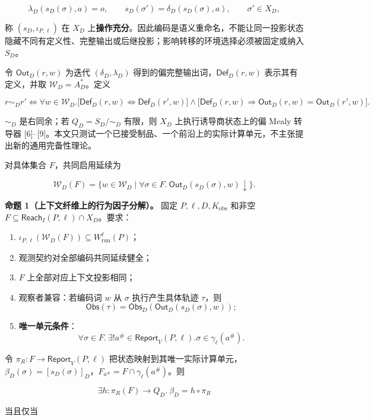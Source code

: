 \documentclass[
  11pt,
  a4paper,
]{ctexart}
\providecommand{\tightlist}{%
  \setlength{\itemsep}{0pt}\setlength{\parskip}{0pt}}
\begin{document}
\[\lambda_D(s_D(\sigma),a)=o,
\qquad s_D(\sigma')=\delta_D(s_D(\sigma),a),
\qquad \sigma'\in X_D,\]

称 \((s_D,\iota_{P,\ell})\) 在 \(X_D\)
上\textbf{操作充分}。因此编码是语义重命名，不能让同一投影状态隐藏不同有定义性、完整输出或后继投影；影响转移的环境选择必须被固定或纳入
\(S_D\)。

令 \(\mathsf{Out}_D(r,w)\) 为迭代 \((\delta_D,\lambda_D)\)
得到的偏完整输出词，\(\mathsf{Def}_D(r,w)\) 表示其有定义，并取
\(\mathcal W_D=A_D^*\)。定义

\[
r\sim_D r'\Longleftrightarrow
\forall w\in\mathcal W_D.\bigl[
\mathsf{Def}_D(r,w)\Leftrightarrow\mathsf{Def}_D(r',w)
\bigr]\land
\bigl[
\mathsf{Def}_D(r,w)\Rightarrow
\mathsf{Out}_D(r,w)=\mathsf{Out}_D(r',w)
\bigr].
\]

\(\sim_D\) 是右同余；若 \(Q_D=S_D/{\sim_D}\) 有限，则 \(X_D\)
上执行诱导商状态上的偏 Mealy 转导器
{[}6{]}--{[}9{]}。本文只测试一个已接受制品、一个前沿上的实际计算单元，不主张提出新的通用完备性理论。

对具体集合 \(F\)，共同启用延续为

\[\mathcal W_D(F)=\{w\in\mathcal W_D\mid
\forall\sigma\in F.\ \mathsf{Out}_D(s_D(\sigma),w)\downarrow\}.\]

\textbf{命题 1（上下文纤维上的行为因子分解）。} 固定
\(P,\ell,D,K_{\mathrm{obs}}\) 和非空
\(F\subseteq\mathsf{Reach}_I(P,\ell)\cap X_D\)。要求：

\begin{enumerate}
\def\labelenumi{\arabic{enumi}.}
\tightlist
\item
  \(\iota_{P,\ell}(\mathcal W_D(F))\subseteq W^\ell_{\mathrm{run}}(P)\)；
\item
  观测契约对全部编码共同延续健全；
\item
  \(F\) 上全部对应上下文投影相同；
\item
  观察者兼容：若编码词 \(w\) 从 \(\sigma\) 执行产生具体轨迹 \(\tau\)，则
  \[\mathsf{Obs}(\tau)=\mathsf{Obs}_D(\mathsf{Out}_D(s_D(\sigma),w));\]
\item
  \textbf{唯一单元条件}：
  \[\forall\sigma\in F.\ \exists!a^\#\in\mathsf{Report}_V(P,\ell).
  \sigma\in\gamma_\ell(a^\#).\]
\end{enumerate}

令 \(\pi_R:F\to\mathsf{Report}_V(P,\ell)\)
把状态映射到其唯一实际计算单元，\(\beta_D(\sigma)=[s_D(\sigma)]_D\)，\(F_{a^\#}=F\cap\gamma_\ell(a^\#)\)。则

\[\exists h:\pi_R(F)\to Q_D.\ \beta_D=h\circ\pi_R\]

当且仅当
\end{document}
